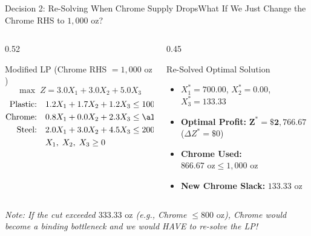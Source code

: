 \documentclass{beamer}
\begin{document}
\begin{frame}{Decision 2: Re-Solving When Chrome Supply Drops}{What If We Just Change the Chrome RHS to $1,000\text{ oz}$?}
    \begin{columns}[T]
        \begin{column}{0.52\textwidth}
            \begin{block}{Modified LP (Chrome RHS $= 1,000\text{ oz}$)}
                \footnotesize
                \[ \max \; Z = 3.0 X_1 + 3.0 X_2 + 5.0 X_3 \]
                \vspace{-0.6em}
                \begin{align*}
                \text{Plastic:}\quad & 1.2 X_1 + 1.7 X_2 + 1.2 X_3 \le 1000 \\
                \text{Chrome:}\quad  & 0.8 X_1 + 0.0 X_2 + 2.3 X_3 \le \alert{\mathbf{1000}} \\
                \text{Steel:}\quad   & 2.0 X_1 + 3.0 X_2 + 4.5 X_3 \le 2000 \\
                & X_1,\; X_2,\; X_3 \ge 0
                \end{align*}
            \end{block}
        \end{column}
        \begin{column}{0.45\textwidth}
            \begin{exampleblock}{Re-Solved Optimal Solution}
                \footnotesize
                \begin{itemize}\setlength{\itemsep}{0.2em}
                    \item $X_1^* = 700.00$, $X_2^* = 0.00$, $X_3^* = 133.33$
                    \item \textbf{Optimal Profit:} $\mathbf{Z^* = \$2,766.67}$ ($\Delta Z^* = \$0$)
                    \item \textbf{Chrome Used:} $866.67\text{ oz} \le 1,000\text{ oz}$
                    \item \textbf{New Chrome Slack:} $133.33\text{ oz}$
                \end{itemize}
            \end{exampleblock}
        \end{column}
    \end{columns}
    \vspace{0.2em}
    \centering \scriptsize \textit{Note: If the cut exceeded $333.33\text{ oz}$ (e.g., Chrome $\le 800\text{ oz}$), Chrome would become a binding bottleneck and we would HAVE to re-solve the LP!}
\end{frame}
\end{document}
